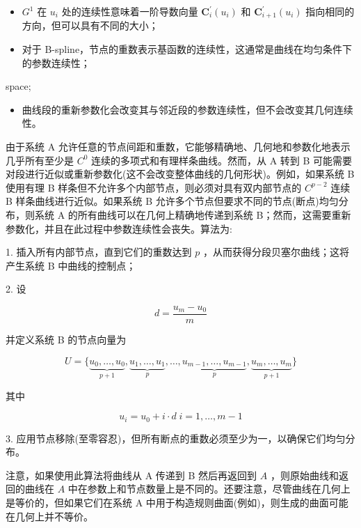 \documentclass[../main.tex]{subfiles}
\begin{document}
\begin{itemize}
\item \({G}^{1}\) 在 \({u}_{i}\) 处的连续性意味着一阶导数向量 \({\mathbf{C}}_{i}^{\prime }\left( {u}_{i}\right)\) 和 \({\mathbf{C}}_{i + 1}^{\prime }\left( {u}_{i}\right)\) 指向相同的方向，但可以具有不同的大小；
\end{itemize}

\begin{itemize}
\item 对于 B-spline，节点的重数表示基函数的连续性，这通常是曲线在均匀条件下的参数连续性；
\end{itemize}

\HRule

space;

\HRule

\begin{itemize}
\item 曲线段的重新参数化会改变其与邻近段的参数连续性，但不会改变其几何连续性。
\end{itemize}

由于系统 A 允许任意的节点间距和重数，它能够精确地、几何地和参数化地表示几乎所有至少是 \({C}^{0}\) 连续的多项式和有理样条曲线。然而，从 A 转到 B 可能需要对段进行近似或重新参数化(这不会改变整体曲线的几何形状)。例如，如果系统 B 使用有理 B 样条但不允许多个内部节点，则必须对具有双内部节点的 \({C}^{p - 2}\) 连续 B 样条曲线进行近似。如果系统 B 允许多个节点但要求不同的节点(断点)均匀分布，则系统 A 的所有曲线可以在几何上精确地传递到系统 B；然而，这需要重新参数化，并且在此过程中参数连续性会丧失。算法为:

1. 插入所有内部节点，直到它们的重数达到 \(p\) ，从而获得分段贝塞尔曲线；这将产生系统 B 中曲线的控制点；

2. 设

\[
d = \frac{{u}_{m} - {u}_{0}}{m}
\]

并定义系统 B 的节点向量为

\[
U = \{ \underset{p + 1}{\underbrace{{u}_{0},\ldots ,{u}_{0}}},\underset{p}{\underbrace{{u}_{1},\ldots ,{u}_{1}}},\ldots ,\underset{p}{\underbrace{{u}_{m - 1},\ldots ,{u}_{m - 1}}},\underset{p + 1}{\underbrace{{u}_{m},\ldots ,{u}_{m}}}\}
\]

其中

\[
{u}_{i} = {u}_{0} + i \cdot  d\;i = 1,\ldots ,m - 1
\]

3. 应用节点移除(至零容忍)，但所有断点的重数必须至少为一，以确保它们均匀分布。

注意，如果使用此算法将曲线从 A 传递到 B 然后再返回到 \(A\) ，则原始曲线和返回的曲线在 \(A\) 中在参数上和节点数量上是不同的。还要注意，尽管曲线在几何上是等价的，但如果它们在系统 A 中用于构造规则曲面(例如)，则生成的曲面可能在几何上并不等价。
\end{document}
